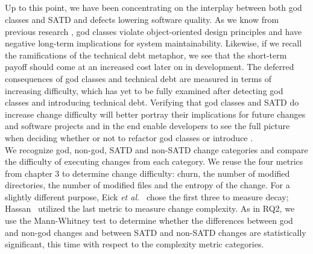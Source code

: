 {\subsection*{\chapterIVrqIII}

Up to this point, we have been concentrating on the interplay between both god classes and SATD and defects lowering software quality. As we know from previous research \cite{marinescu2004detection}, god classes violate object-oriented design principles and have negative long-term implications for system maintainability. Likewise, if we recall the ramifications of the technical debt metaphor, we see that the short-term payoff should come at an increased cost later on in development. The deferred consequences of god classes and technical debt are measured in terms of increasing difficulty, which has yet to be fully examined after detecting god classes and introducing technical debt. Verifying that god classes and SATD do increase change difficulty will better portray their implications for future changes and software projects and in the end enable developers to see the full picture when deciding whether or not to refactor god classes or introduce \SATD. \\

We recognize god, non-god, SATD and non-SATD change categories and compare the difficulty of executing changes from each category. We reuse the four metrics from chapter 3 to determine change difficulty: churn, the number of modified directories, the number of modified files and the entropy of the change. For a slightly different purpose, Eick \emph{et al.}~\cite{eick2001decay} chose the first three to measure decay; Hassan~\cite{hassan2009predicting} utilized the last metric to measure change complexity. As in RQ2, we use the Mann-Whitney test \cite{mann1947test} to determine whether the differences between god and non-god changes and between SATD and non-SATD changes are statistically significant, this time with respect to the complexity metric categories. 





}
